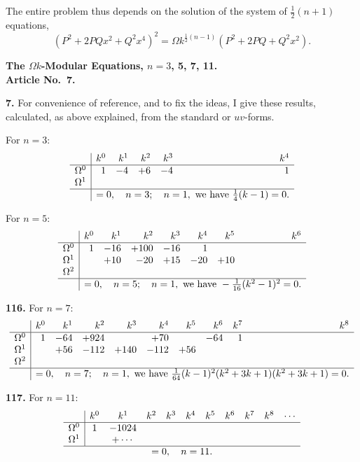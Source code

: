 \documentclass[11pt,a4paper]{book}
\begin{document}
The entire problem thus depends on the solution of the system of $\frac{1}{2}(n + 1)$ equations,
\[
(P^2 + 2PQx^2 + Q^2x^4)^2 = \Omega k^{\frac{1}{2}(n - 1)}(P^2 + 2PQ + Q^2x^2).
\]

\medskip
\noindent\textbf{The $\Omega k$-Modular Equations, $n = 3$, 5, 7, 11.}\\
\textbf{Article No.~7.}

\medskip
\noindent\textbf{7.} For convenience of reference, and to fix the ideas, I give these results, calculated, as above explained, from the standard or $uv$-forms.

For $n = 3$:
\[
\begin{array}{r|rrrrr}
& k^0 & k^1 & k^2 & k^3 & k^4 \\
\hline
\Omega^0 & 1 & -4 & +6 & -4 & 1 \\
\Omega^1 & & & & & \\
\hline
& \multicolumn{5}{c}{= 0, \quad n = 3; \quad n = 1, \text{ we have } \tfrac{1}{4}(k - 1) = 0.}
\end{array}
\]

For $n = 5$:
\[
\begin{array}{r|rrrrrrr}
& k^0 & k^1 & k^2 & k^3 & k^4 & k^5 & k^6 \\
\hline
\Omega^0 & 1 & -16 & +100 & -16 & 1 & & \\
\Omega^1 & & +10 & -20 & +15 & -20 & +10 & \\
\Omega^2 & & & & & & & \\
\hline
& \multicolumn{7}{c}{= 0, \quad n = 5; \quad n = 1, \text{ we have } -\tfrac{1}{16}(k^2 - 1)^2 = 0.}
\end{array}
\]

\medskip
\noindent\textbf{116.} For $n = 7$:
\[
\begin{array}{r|rrrrrrrrr}
& k^0 & k^1 & k^2 & k^3 & k^4 & k^5 & k^6 & k^7 & k^8 \\
\hline
\Omega^0 & 1 & -64 & +924 & & +70 & & -64 & 1 \\
\Omega^1 & & +56 & -112 & +140 & -112 & +56 & & \\
\Omega^2 & & & & & & & & & \\
\hline
& \multicolumn{9}{l}{= 0, \quad n = 7; \quad n = 1, \text{ we have } \tfrac{1}{64}(k - 1)^2(k^2 + 3k + 1)(k^2 + 3k + 1) = 0.}
\end{array}
\]

\medskip
\noindent\textbf{117.} For $n = 11$:
\[
\begin{array}{r|cccccccccc}
& k^0 & k^1 & k^2 & k^3 & k^4 & k^5 & k^6 & k^7 & k^8 & \cdots \\
\hline
\Omega^0 & 1 & -1024 & & & & & & & & \\
\Omega^1 & & +\cdots & & & & & & & & \\
\hline
\multicolumn{11}{c}{= 0, \quad n = 11.}
\end{array}
\]
\end{document}
